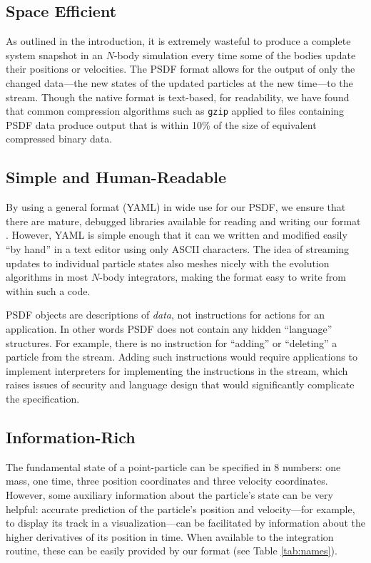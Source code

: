 \documentclass[5p,authoryear]{elsarticle}
\begin{document}
\subsection{Space Efficient}

As outlined in the introduction, it is extremely wasteful to produce a
complete system snapshot in an $N$-body simulation every time some of
the bodies update their positions or velocities.  The PSDF format
allows for the output of only the changed data---the new states of the
updated particles at the new time---to the stream.  Though the native
format is text-based, for readability, we have found that common
compression algorithms such as {\tt gzip} applied to files containing
PSDF data produce output that is within 10\% of the size of equivalent
compressed binary data.

\subsection{Simple and Human-Readable}

By using a general format (YAML) in wide use for our PSDF, we ensure
that there are mature, debugged libraries available for reading and
writing our format \citep{YAML2011}.  However, YAML is simple enough
that it can we written and modified easily ``by hand'' in a text
editor using only ASCII characters.  The idea of streaming updates to
individual particle states also meshes nicely with the evolution
algorithms in most $N$-body integrators, making the format easy to
write from within such a code.

PSDF objects are descriptions of \emph{data}, not instructions for
actions for an application.  In other words PSDF does not contain any
hidden ``language'' structures.  For example, there is no instruction
for ``adding'' or ``deleting'' a particle from the stream.  Adding
such instructions would require applications to implement interpreters
for implementing the instructions in the stream, which raises issues
of security and language design that would significantly complicate
the specification.

\subsection{Information-Rich}

The fundamental state of a point-particle can be specified in 8
numbers: one mass, one time, three position coordinates and three
velocity coordinates.  However, some auxiliary information about the
particle's state can be very helpful: accurate prediction of the
particle's position and velocity---for example, to display its track
in a visualization---can be facilitated by information about the
higher derivatives of its position in time.  When available to the
integration routine, these can be easily provided by our format (see
Table \ref{tab:names}).  
\end{document}

